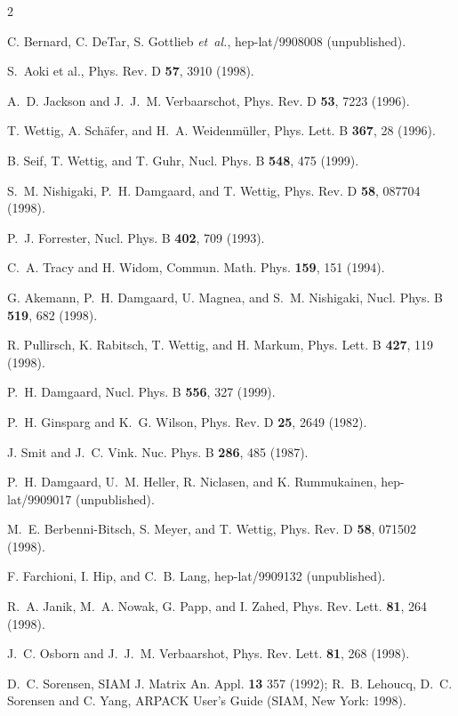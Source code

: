 \begin{multicols}{2}
\begin{references}
C. Bernard, C. DeTar, S. Gottlieb {\it et~al.}, hep-lat/9908008  (unpublished).

S.~Aoki et al., Phys. Rev. D {\bf 57}, 3910 (1998). 

A.~D. Jackson and J.~J.~M. Verbaarschot, Phys. Rev. D {\bf 53},  7223  (1996).

T. Wettig, A. Sch{\"a}fer, and H.~A. Weidenm{\"u}ller, Phys. Lett. B {\bf 367},
   28  (1996).

B. Seif, T. Wettig, and T. Guhr, Nucl. Phys. B {\bf 548}, 475 (1999).

S.~M. Nishigaki, P.~H. Damgaard, and T. Wettig, Phys. Rev. D {\bf 58},  087704
  (1998).

P.~J. Forrester, Nucl. Phys. B {\bf 402},  709  (1993).

C.~A. Tracy and H. Widom, Commun. Math. Phys. {\bf 159},  151  (1994).

G. Akemann, P.~H. Damgaard, U. Magnea, and S.~M. Nishigaki, Nucl. Phys. B {\bf
  519},  682  (1998).

R. Pullirsch, K. Rabitsch, T. Wettig, and H. Markum, Phys. Lett.  B {\bf 427},
119 (1998).

P.~H. Damgaard, Nucl. Phys. B {\bf 556}, 327 (1999).

P.~H. Ginsparg and K.~G. Wilson,
Phys. Rev. D {\bf 25}, 2649 (1982).

J. Smit and J.~C. Vink. Nuc. Phys. B {\bf 286}, 485 (1987).

P.~H. Damgaard, U.~M. Heller, R. Niclasen, and K. Rummukainen, 
hep-lat/9909017 (unpublished).

M.~E. Berbenni-Bitsch, S. Meyer, and T. Wettig, Phys. Rev. D {\bf 58},  071502
  (1998).

F. Farchioni, I. Hip, and C.~B. Lang,
hep-lat/9909132 (unpublished).

R.~A. Janik, M.~A. Nowak, G. Papp, and I. Zahed, Phys. Rev. Lett. {\bf 81},
  264  (1998).

J.~C. Osborn and J.~J.~M. Verbaarshot, Phys. Rev. Lett. {\bf 81},  268  (1998).

D.~C. Sorensen, SIAM J. Matrix An. Appl. {\bf 13} 357 (1992);
R.~B. Lehoucq, D.~C. Sorensen and C. Yang, ARPACK User's Guide (SIAM,
New York: 1998).


\end{references}
\end{multicols}
